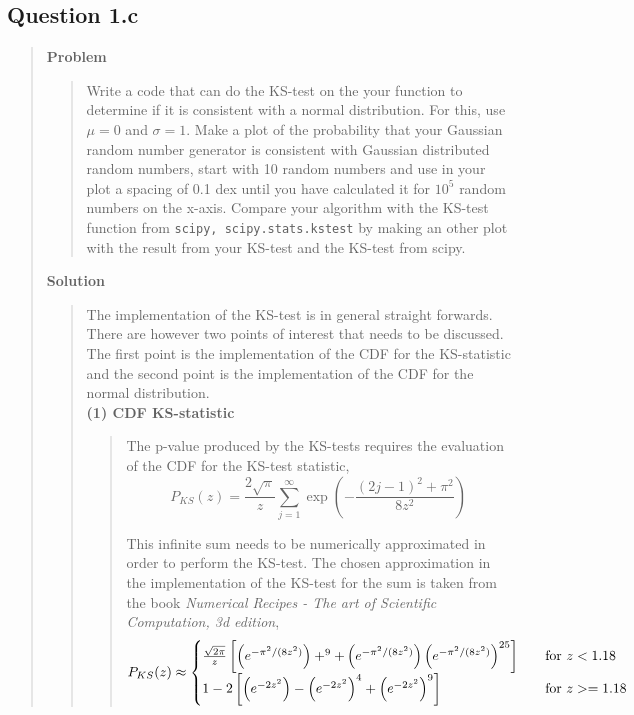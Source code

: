
\subsection*{\textbf{Question 1.c}}
\begin{quote}

\textbf{Problem}
\begin{quote}
Write a code that can do the KS-test on the your function to determine if it is consistent with a normal distribution. For this, use $\mu = 0$ and $\sigma = 1$. Make a plot of the probability that your Gaussian random number generator is consistent with Gaussian distributed random numbers, start with 10 random numbers and use in your plot a spacing of 0.1 dex until you have calculated it for $10^5$ random numbers on the x-axis. Compare your algorithm with the KS-test function from \texttt{scipy, scipy.stats.kstest} by making an other plot with the result from your KS-test and the KS-test from scipy.
\end{quote}

\textbf{Solution} 
\begin{quote}
The implementation of the KS-test is in general straight forwards. There are however two points of interest that needs to be discussed. The first point is the implementation of the CDF for the KS-statistic and the second point is the implementation of the CDF for the normal distribution.
\\

\textbf{(1) CDF KS-statistic }
\begin{quote}
The p-value produced by the KS-tests requires the evaluation of the CDF for the KS-test statistic,
\begin{equation}
P_{KS}(z) = \frac{2\sqrt{\pi}}{z} \sum_{j=1}^{\infty} \exp\left(- \frac{(2j-1)^2+\pi^2}{8z^2} \right)
\end{equation}

This infinite sum needs to be numerically approximated in order to perform the KS-test. The chosen approximation in the implementation of the KS-test for  the sum is taken from the book \textit{Numerical Recipes - The art of Scientific Computation, 3d edition}, %
\begin{equation}
P_{KS}(z) \approx
\begin{cases}
\frac{\sqrt{2 \pi}}{z} \left[ \left( e^{-\pi^2/(8z^2)} \right)+^{9} + \left( e^{-\pi^2/(8z^2)} \right) \left( e^{-\pi^2/(8z^2)} \right)^{25} \right] &\quad \text{for $ z < 1.18$}\\
1 -2 \left[ \left(e^{-2z^2}\right) - \left(e^{-2z^2}\right)^4 + \left(e^{-2z^2}\right)^9 \right]  &\quad \text{for $ z >= 1.18$}
\end{cases}
\end{equation}
\end{quote}


\end{quote}
\end{quote}
